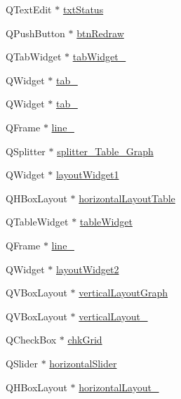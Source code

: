 \begin{DoxyCompactItemize}
\item 
Q\+Text\+Edit $\ast$ \hyperlink{class_ui___main_window_a88d2111e9a8c361d0cf15eedd9183f68}{txt\+Status}
\item 
Q\+Push\+Button $\ast$ \hyperlink{class_ui___main_window_a11e3b88f851cc38c95e233d684684ae8}{btn\+Redraw}
\item 
Q\+Tab\+Widget $\ast$ \hyperlink{class_ui___main_window_abad0690efa1c9be5f384e20a19762187}{tab\+Widget\+\_}
\item 
Q\+Widget $\ast$ \hyperlink{class_ui___main_window_a83495b23cbc6810f81978dc0d584b810}{tab\+\_}
\item 
Q\+Widget $\ast$ \hyperlink{class_ui___main_window_a41c7e77dd12b9445e13dbe8fb5ae1488}{tab\+\_}
\item 
Q\+Frame $\ast$ \hyperlink{class_ui___main_window_a17207206e55a605ecc14a3534b7e575f}{line\+\_}
\item 
Q\+Splitter $\ast$ \hyperlink{class_ui___main_window_a54e02315be330fceffebd449ffec70a9}{splitter\+\_\+\+Table\+\_\+\+Graph}
\item 
Q\+Widget $\ast$ \hyperlink{class_ui___main_window_aab31b3dec8d767525dea6f163e029e48}{layout\+Widget1}
\item 
Q\+H\+Box\+Layout $\ast$ \hyperlink{class_ui___main_window_a51e95f49de53075c1e7f7421f39e6e2f}{horizontal\+Layout\+Table}
\item 
Q\+Table\+Widget $\ast$ \hyperlink{class_ui___main_window_a337a21c052f1a3f0f0071d282e818744}{table\+Widget}
\item 
Q\+Frame $\ast$ \hyperlink{class_ui___main_window_a27e0b134c3c12643afbf0b50dd175453}{line\+\_}
\item 
Q\+Widget $\ast$ \hyperlink{class_ui___main_window_a6cda85bb4cf776930c0f4d4dcf906751}{layout\+Widget2}
\item 
Q\+V\+Box\+Layout $\ast$ \hyperlink{class_ui___main_window_a5fd4b18ed282c1cda8a8e488a4068aea}{vertical\+Layout\+Graph}
\item 
Q\+V\+Box\+Layout $\ast$ \hyperlink{class_ui___main_window_a6f40fc110b15410c00837a446d57bdbe}{vertical\+Layout\+\_}
\item 
Q\+Check\+Box $\ast$ \hyperlink{class_ui___main_window_a2f8801787622973f29e51e8cf731b86a}{chk\+Grid}
\item 
Q\+Slider $\ast$ \hyperlink{class_ui___main_window_ae0d25af9b3ed9386441e76f06d3f3ddb}{horizontal\+Slider}
\item 
Q\+H\+Box\+Layout $\ast$ \hyperlink{class_ui___main_window_a14c9d4842c3e97e16e7873ef0aecdb1e}{horizontal\+Layout\+\_}

\end{DoxyCompactItemize}
